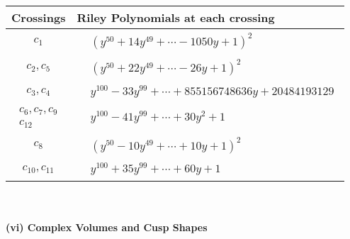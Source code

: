 \documentclass[1p]{elsarticle_modified}
\theoremstyle{definition}
\begin{document}
\begin{tabular}{m{50pt}|m{274pt}}
Crossings & \hspace{64pt}Riley Polynomials at each crossing \\
\hline $$\begin{aligned}c_{1}\end{aligned}$$&$\begin{aligned}
&(y^{50}+14 y^{49}+\cdots-1050 y+1)^{2}
\end{aligned}$\\
\hline $$\begin{aligned}c_{2},c_{5}\end{aligned}$$&$\begin{aligned}
&(y^{50}+22 y^{49}+\cdots-26 y+1)^{2}
\end{aligned}$\\
\hline $$\begin{aligned}c_{3},c_{4}\end{aligned}$$&$\begin{aligned}
&y^{100}-33 y^{99}+\cdots+855156748636 y+20484193129
\end{aligned}$\\
\hline $$\begin{aligned}c_{6},c_{7},c_{9}\\c_{12}\end{aligned}$$&$\begin{aligned}
&y^{100}-41 y^{99}+\cdots+30 y^2+1
\end{aligned}$\\
\hline $$\begin{aligned}c_{8}\end{aligned}$$&$\begin{aligned}
&(y^{50}-10 y^{49}+\cdots+10 y+1)^{2}
\end{aligned}$\\
\hline $$\begin{aligned}c_{10},c_{11}\end{aligned}$$&$\begin{aligned}
&y^{100}+35 y^{99}+\cdots+60 y+1
\end{aligned}$\\
\hline
\end{tabular}\\~\\
\newpage\flushleft \textbf{(vi) Complex Volumes and Cusp Shapes}
\end{document}
